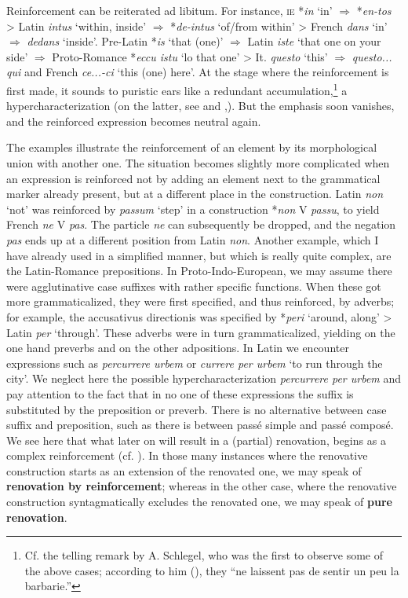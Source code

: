 Reinforcement can be reiterated ad libitum. For instance, \textsc{ie} *\textit{in} ‘in’ $\Rightarrow $ *\textit{en-tos} {\textgreater} Latin \textit{intus} ‘within, inside’ $\Rightarrow $ *\textit{de-intus} ‘of/from within’ {\textgreater} French \textit{dans} ‘in’ $\Rightarrow $ \textit{dedans} ‘inside’. Pre-Latin *\textit{is} ‘that (one)’ $\Rightarrow $ Latin \textit{iste} ‘that one on your side’ $\Rightarrow $ Proto-Romance *\textit{eccu istu} ‘lo that one’ {\textgreater} It. \textit{questo} ‘this’ $\Rightarrow $ \textit{questo... qui} and French \textit{ce...-ci} ‘this (one) here’. At the stage where the reinforcement is first made, it sounds to puristic ears like a redundant accumulation,\footnote{Cf. the telling remark by A. Schlegel, who was the first to observe some of the above cases; according to him (\citeyear[30]{Schlegel1818}), they “ne laissent pas de sentir un peu la barbarie.”} a hypercharacterization (on the latter, see \citet{Malkiel1957} and \citet[Ch.~\textsc{iv}]{Tauli1966},). But the emphasis soon vanishes, and the reinforced expression becomes neutral again.

The examples illustrate the reinforcement of an element by its morphological union with another one. The situation becomes slightly more complicated when an expression is reinforced not by adding an element next to the grammatical marker already present, but at a different place in the construction. Latin \textit{non} ‘not’ was reinforced by \textit{passum} ‘step’ in a construction *\textit{non} V \textit{passu}, to yield French \textit{ne} V \textit{pas}. The particle \textit{ne} can subsequently be dropped, and the negation \textit{pas} ends up at a different position from Latin \textit{non}. Another example, which I have already used in a simplified manner, but which is really quite complex, are the Latin-Romance prepositions. In Proto-Indo-European, we may assume there were agglutinative case suffixes with rather specific functions. When these got more grammaticalized, they were first specified, and thus reinforced, by adverbs; for example, the accusativus directionis was specified by *\textit{peri} ‘around, along’ {\textgreater} Latin \textit{per} ‘through’. These adverbs were in turn grammaticalized, yielding on the one hand preverbs and on the other adpositions. In Latin we encounter expressions such as \textit{percurrere urbem} or \textit{currere per urbem} ‘to run through the city’. We neglect here the possible hypercharacterization \textit{percurrere per urbem} and pay attention to the fact that in no one of these expressions the suffix is substituted by the preposition or preverb. There is no alternative between case suffix and preposition, such as there is between passé simple and passé composé. We see here that what later on will result in a (partial) renovation, begins as a complex reinforcement (cf. \citealt[55]{Jakobson1936}). In those many instances where the renovative construction starts as an extension of the renovated one, we may speak of \textbf{renovation by reinforcement}; whereas in the other case, where the renovative construction syntagmatically excludes the renovated one, we may speak of \textbf{pure renovation}.

